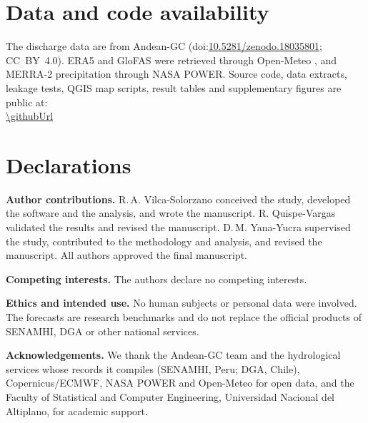 \section*{Data and code availability}
The discharge data are from Andean-GC (doi:\href{https://doi.org/10.5281/zenodo.18035801}{10.5281/zenodo.18035801}; CC~BY~4.0). ERA5 and GloFAS were retrieved through Open-Meteo \cite{openmeteo}, and MERRA-2 precipitation through NASA POWER. Source code, data extracts, leakage tests, QGIS map scripts, result tables and supplementary figures are public at:\\ {\small\url{\githubUrl}}

\section*{Declarations}
\noindent\textbf{Author contributions.} R.\,A. Vilca-Solorzano conceived the study, developed the software and the analysis, and wrote the manuscript. R. Quispe-Vargas validated the results and revised the manuscript. D.\,M. Yana-Yucra supervised the study, contributed to the methodology and analysis, and revised the manuscript. All authors approved the final manuscript.

\smallskip\noindent\textbf{Competing interests.} The authors declare no competing interests.

\smallskip\noindent\textbf{Ethics and intended use.} No human subjects or personal data were involved. The forecasts are research benchmarks and do not replace the official products of SENAMHI, DGA or other national services.

\smallskip\noindent\textbf{Acknowledgements.} We thank the Andean-GC team and the hydrological services whose records it compiles (SENAMHI, Peru; DGA, Chile), Copernicus/ECMWF, NASA POWER and Open-Meteo for open data, and the Faculty of Statistical and Computer Engineering, Universidad Nacional del Altiplano, for academic support.
